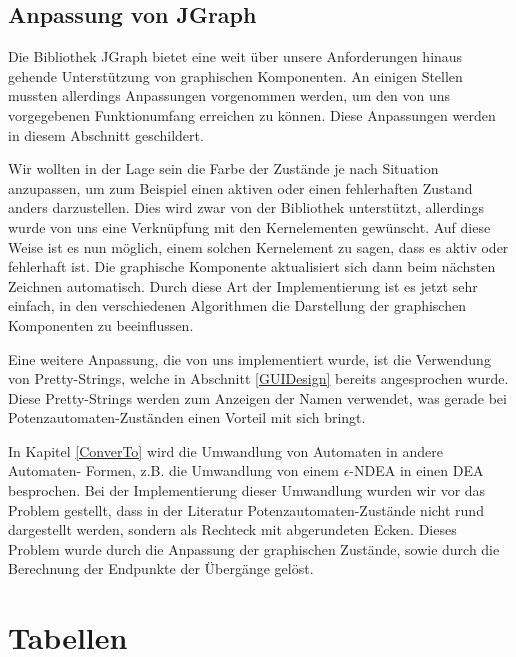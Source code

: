 \subsection{Anpassung von JGraph}\label{GraphJGraphAdaptation}

Die Bibliothek JGraph bietet eine weit über unsere Anforderungen hinaus
gehende Unterstützung von graphischen Komponenten. An einigen Stellen mussten
allerdings Anpassungen vorgenommen werden, um den von uns vorgegebenen
Funktionumfang erreichen zu können. Diese Anpassungen werden in diesem
Abschnitt geschildert.\vspace{10pt}

Wir wollten in der Lage sein die Farbe der Zustände je nach Situation anzupassen,
um zum Beispiel einen aktiven oder einen fehlerhaften Zustand anders
darzustellen. Dies wird zwar von der Bibliothek unterstützt, allerdings wurde von
uns eine Verknüpfung mit den Kernelementen gewünscht. Auf diese Weise ist es nun
möglich, einem solchen Kernelement zu sagen, dass es aktiv oder fehlerhaft ist.
Die graphische Komponente aktualisiert sich dann beim nächsten Zeichnen
automatisch. Durch diese Art der Implementierung ist es jetzt sehr einfach, in
den verschiedenen Algorithmen die Darstellung der graphischen Komponenten zu
beeinflussen.\vspace{10pt}

Eine weitere Anpassung, die von uns implementiert wurde, ist die Verwendung von
Pretty-Strings, welche in Abschnitt \ref{GUIDesign} bereits angesprochen wurde.
Diese Pretty-Strings werden zum Anzeigen der Namen verwendet, was gerade bei
Potenzautomaten-Zuständen einen Vorteil mit sich bringt.\vspace{10pt}

In Kapitel \ref{ConverTo} wird die Umwandlung von Automaten in andere Automaten-
Formen, z.B. die Umwandlung von einem $\epsilon$-NDEA in einen DEA besprochen.
Bei der Implementierung dieser Umwandlung wurden wir vor das Problem gestellt,
dass in der Literatur Potenzautomaten-Zustände nicht rund dargestellt werden,
sondern als Rechteck mit abgerundeten Ecken. Dieses Problem wurde durch die
Anpassung der graphischen Zustände, sowie durch die Berechnung der Endpunkte der
Übergänge gelöst.\vspace{10pt}


\section{Tabellen}\label{Tables}

